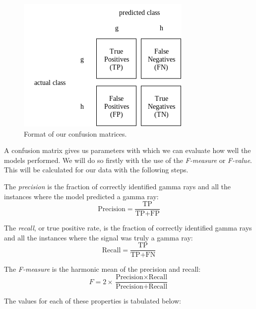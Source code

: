 \documentclass[a4paper, 12pt]{report}
\theoremstyle{definition}
\begin{document}
\begin{figure}[h!]
    \includegraphics[scale=0.9]{im/conmatexform.png}
    \caption{Format of our confusion matrices.}
    \label{fig:conmatex}
\end{figure}

A confusion matrix gives us parameters with which we can evaluate how well the models performed. We will do so firstly with the use of the \textit{F-measure} or \textit{F-value}. This will be calculated for our data with the following steps.

\newpage

The \textit{precision} is the fraction of correctly identified gamma rays and all the instances where the model predicted a gamma ray:
\begin{equation}
    \text{Precision} = \frac{\text{TP}}{\text{TP}+\text{FP}}
\end{equation}

The \textit{recall}, or true positive rate, is the fraction of correctly identified gamma rays and all the instances where the signal was truly a gamma ray: 
\begin{equation}
    \text{Recall} = \frac{\text{TP}}{\text{TP}+\text{FN}}
\end{equation}

The \textit{F-measure} is the harmonic mean of the precision and recall:
\begin{equation}
    F = 2 \times \frac{\text{Precision} \times \text{Recall}}{\text{Precision} + \text{Recall}}
\end{equation}

The values for each of these properties is tabulated below:
\end{document}
